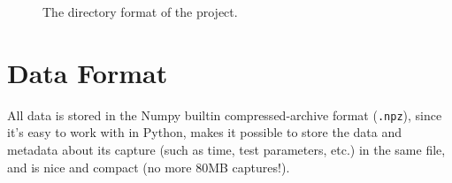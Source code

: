 \documentclass{article}
\newcommand{\code}{\texttt}
\begin{document}
\begin{figure}[h]
\begin{center}
\end{center}

\caption{The directory format of the project.}
\label{dirform}
\end{figure}


    \section{Data Format}
    All data is stored in the Numpy builtin compressed-archive format (\code{.npz}), since it's easy to work with in Python, makes it possible to store the data and metadata about its capture (such as time, test parameters, etc.) in the same file, and is nice and compact (no more 80MB captures!).
\end{document}
